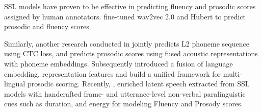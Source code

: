 \documentclass[11pt]{article}
\begin{document}

SSL models have proven to be effective in predicting fluency and prosodic scores assigned by human annotators. \citet{kim2022automatic, 10022486,yang2022improving} fine-tuned wav2vec 2.0 and Hubert to predict prosodic and fluency scores. 

Similarly, another research conducted in \cite{10022486} jointly predicts L2 phoneme sequence using CTC loss, and predicts prosodic scores using fused acoustic representations with phoneme embeddings. Subsequently \citet{lin2023multi} introduced a fusion of language embedding, representation features and build a unified framework for multi-lingual prosodic scoring. Recently, \citet{3M,kheir2023complementary,chen2023multipa}, enriched  latent speech extracted from SSL models with handcrafted frame- and utterance-level non-verbal paralinguistic cues such as duration, and energy for modeling Fluency and Prosody scores.


\end{document}
